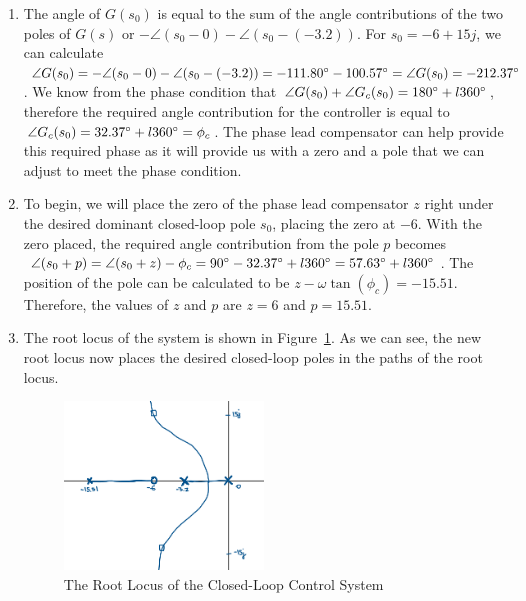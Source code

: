 \documentclass[12pt]{article}
\begin{document}
\begin{enumerate}
    \item %
    The angle of $G(s_0)$ is equal to the sum of the angle contributions of the two poles of $G(s)$ or $-\angle (s_0 - 0) - \angle (s_0 - (-3.2))$. For $s_0 = -6 + 15j$, we can calculate $\angle G(s_0) = -\angle (s_0 - 0) - \angle (s_0 - (-3.2)) = -111.80\degree - 100.57\degree = \angle G(s_0) = -212.37\degree$. We know from the phase condition that $\angle G(s_0) + \angle G_c(s_0) = 180\degree + l360\degree$, therefore the required angle contribution for the controller is equal to $\angle G_c(s_0) = 32.37\degree + l360\degree = \phi_c$. The phase lead compensator can help provide this required phase as it will provide us with a zero and a pole that we can adjust to meet the phase condition.

    \item %
    To begin, we will place the zero of the phase lead compensator $z$ right under the desired dominant closed-loop pole $s_0$, placing the zero at $-6$. With the zero placed, the required angle contribution from the pole $p$ becomes $\angle (s_0 + p) = \angle (s_0 + z) - \phi_c  = 90\degree - 32.37\degree + l360\degree = 57.63\degree + l360\degree$. The position of the pole can be calculated to be $z - \omega \tan(\phi_c) = -15.51$. Therefore, the values of $z$ and $p$ are $z = 6$ and $p = 15.51$.

    \item %
    The root locus of the system is shown in Figure~\ref{fig:q5_root_locus}. As we can see, the new root locus now places the desired closed-loop poles in the paths of the root locus.
    \begin{figure}[h]
        \centering
        \includegraphics[width=0.5\textwidth]{q5}
        \caption{\label{fig:q5_root_locus}The Root Locus of the Closed-Loop Control System}
    \end{figure}


\end{enumerate}
\end{document}

